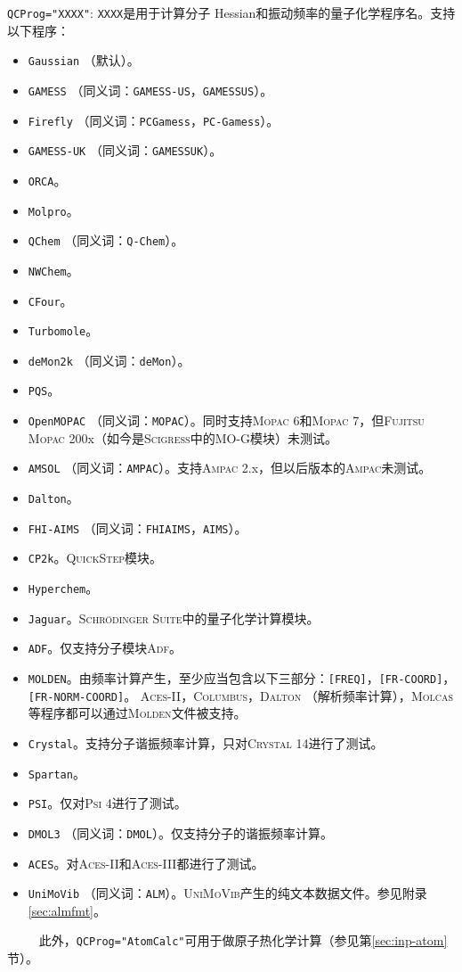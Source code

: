 \documentclass[12pt,a4paper,openany,twoside,cap]{ctexbook}
\begin{document}
\bigskip{}\bigskip{}
\verb|QCProg="XXXX"|: \verb|XXXX|是用于计算分子 Hessian和振动频率的量子化学程序名。支持以下程序：
\begin{itemize}
\item \verb|Gaussian| （默认）。
\item \verb|GAMESS| （同义词：\verb|GAMESS-US|，\verb|GAMESSUS|）。
\item \verb|Firefly| （同义词：\verb|PCGamess|，\verb|PC-Gamess|）。
\item \verb|GAMESS-UK| （同义词：\verb|GAMESSUK|）。
\item \verb|ORCA|。
\item \verb|Molpro|。
\item \verb|QChem| （同义词：\verb|Q-Chem|）。
\item \verb|NWChem|。
\item \verb|CFour|。
\item \verb|Turbomole|。
\item \verb|deMon2k| （同义词：\verb|deMon|）。
\item \verb|PQS|。
\item \verb|OpenMOPAC| （同义词：\verb|MOPAC|）。同时支持\textsc{Mopac} 6和\textsc{Mopac} 7，但\textsc{Fujitsu Mopac} 200x（如今是\textsc{Scigress}中的MO-G模块）未测试。
\item \verb|AMSOL| （同义词：\verb|AMPAC|）。支持\textsc{Ampac} 2.x，但以后版本的\textsc{Ampac}未测试。
\item \verb|Dalton|。
\item \verb|FHI-AIMS| （同义词：\verb|FHIAIMS|，\verb|AIMS|）。
\item \verb|CP2k|。\textsc{QuickStep}模块。
\item \verb|Hyperchem|。
\item \verb|Jaguar|。\textsc{Schr\"odinger Suite}中的量子化学计算模块。
\item \verb|ADF|。仅支持分子模块\textsc{Adf}。
\item \verb|MOLDEN|。由频率计算产生，至少应当包含以下三部分：\verb|[FREQ]|，\verb|[FR-COORD]|，\verb|[FR-NORM-COORD]|。 \textsc{Aces-II}，\textsc{Columbus}，\textsc{Dalton} （解析频率计算），\textsc{Molcas}等程序都可以通过\textsc{Molden}文件被支持。
\item \verb|Crystal|。支持分子谐振频率计算，只对\textsc{Crystal} 14进行了测试。
\item \verb|Spartan|。
\item \verb|PSI|。仅对\textsc{Psi} 4进行了测试。
\item \verb|DMOL3| （同义词：\verb|DMOL|）。仅支持分子的谐振频率计算。
\item \verb|ACES|。对\textsc{Aces-II}和\textsc{Aces-III}都进行了测试。
\item \verb|UniMoVib| （同义词：\verb|ALM|）。\textsc{UniMoVib}产生的纯文本数据文件。参见附录\ref{sec:almfmt}。
\end{itemize}
\verb|     |此外，\verb|QCProg="AtomCalc"|可用于做原子热化学计算（参见第\ref{sec:inp-atom}节）。
\end{document}
